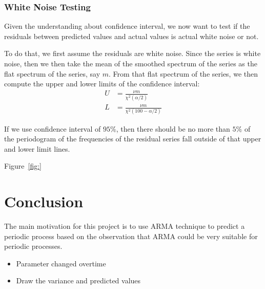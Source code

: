 \documentclass[12pt]{article}
\begin{document}
\subsubsection{White Noise Testing}
Given the understanding about confidence interval, we now want to test if the
residuals between predicted values and actual values is actual white noise or
not.

To do that, we first assume the residuals are white noise. Since the series is
white noise, then we then take the mean of the smoothed spectrum of the series
as the flat spectrum of the series, say $m$. From that flat spectrum of the
series, we then compute the upper and lower limits of the confidence interval:
\begin{align}
U &= \frac{\nu m}{\chi^2(\alpha/2)}\\
L &= \frac{\nu m}{\chi^2(100-\alpha/2)}
\end{align}

If we use confidence interval of $95\%$, then there should be no more than $5\%$
of the periodogram of the frequencies of the residual series fall outside of
that upper and lower limit lines.

Figure~\ref{fig:}



\section{Conclusion}
The main motivation for this project is to use ARMA technique to predict a
periodic process based on the observation that ARMA could be very suitable for
periodic processes.

\begin{itemize}
  \item Parameter changed overtime
  \item Draw the variance and predicted values
\end{itemize}



\end{document}
